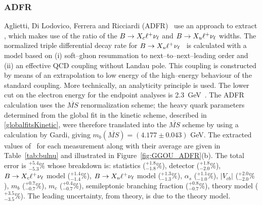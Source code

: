\subsubsection{ADFR}
Aglietti, Di Lodovico, Ferrera and Ricciardi (ADFR)~\cite{Aglietti:2007ik}
use an approach to extract \vub, which makes use of the ratio
of the  $B \to X_c \ell^+ \nu_\ell$ and $B \to X_u \ell^+ \nu_\ell$ widths. 
The normalized triple differential decay rate for 
$B \to X_u \ell^+ \nu_\ell$~\cite{Aglietti:2006yb,Aglietti:2005mb, Aglietti:2005bm, Aglietti:2005eq}
is calculated with a model based on (i) soft--gluon resummation 
to next--to--next--leading order and (ii) an effective QCD coupling without
Landau pole. This coupling is constructed by means of an extrapolation to low
energy of the high--energy behaviour of the standard coupling. More technically,
an analyticity principle is used.
The lower cut on the electron energy for the endpoint analyses is 2.3~GeV~\cite{Aglietti:2006yb}.
The ADFR calculation uses the $\overline{MS}$ renormalization scheme; the heavy quark parameters determined  
from the global fit in the kinetic scheme, described in \ref{globalfitsKinetic}, were therefore 
translated into the $\overline{MS}$ scheme by using a calculation by Gardi, giving 
$m_b({\overline{MS}})=(4.177 \pm 0.043)$ GeV.
The extracted values
of \vub\, for each measurement along with their average are given in
Table~\ref{tab:bulnu} and illustrated in Figure~\ref{fig:GGOU_ADFR}(b).
The total error is $^{+5.4}_{-5.3}\%$ whose breakdown is:
statistics ($^{+1.8}_{-1.8}\%$),
detector ($^{+1.8}_{-2.0}\%$),
$B\to X_c \ell^+ \nu_\ell$ model ($^{+1.4}_{-1.4}\%$),
$B\to X_u \ell^+ \nu_\ell$ model ($^{+1.3}_{-1.3}\%$),
$\alpha_s$ ($^{+1.1}_{-1.0}\%$), 
$|V_{cb}|$ ($^{+2.0}_{-2.0}\%$), 
$m_b$ ($^{+0.7}_{-0.7}\%$), 
$m_c$ ($^{+0.4}_{-0.7}\%$), 
semileptonic branching fraction ($^{+0.8}_{-0.7}\%$), 
theory model ($^{+3.5}_{-3.5}\%$).
The leading
uncertainty, from theory, is due to the theory model.


